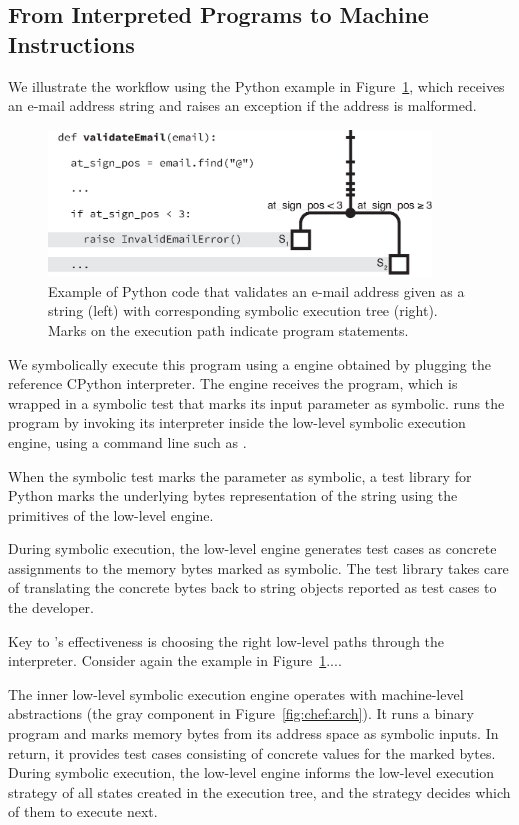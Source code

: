 \subsection{From Interpreted Programs to Machine Instructions}

We illustrate the \chef workflow using the Python example in Figure~\ref{fig:chef:running-example}, which receives an e-mail address string and raises an exception if the address is malformed.

\begin{figure}
  \centering
  \includegraphics[width=4in]{figures/chef/running-example}
  \caption{Example of Python code that validates an e-mail address given as a string (left) with corresponding symbolic execution tree (right).  Marks on the execution path indicate program statements.}
  \label{fig:chef:running-example}
\end{figure}

We symbolically execute this program using a \chef engine obtained by plugging the reference CPython interpreter.
%
The \chef engine receives the program, which is wrapped in a symbolic test that marks its input parameter  as symbolic.
%
\chef runs the program by invoking its interpreter inside the low-level symbolic execution engine, using a command line such as .

When the symbolic test marks the  parameter as symbolic, a \chef test library for Python marks the underlying bytes representation of the string using the primitives of the low-level engine.

During symbolic execution, the low-level engine generates test cases as concrete assignments to the memory bytes marked as symbolic.
%
The \chef test library takes care of translating the concrete bytes back to string objects reported as test cases to the developer.

Key to \chef's effectiveness is choosing the right low-level paths through the interpreter.
%
Consider again the example in Figure~\ref{fig:chef:running-example}....


The inner low-level symbolic execution engine operates with machine-level abstractions (the gray component in Figure~\ref{fig:chef:arch}).
%
It runs a binary program and marks memory bytes from its address space as symbolic inputs.  In return, it provides test cases consisting of concrete values for the marked bytes.
%
During symbolic execution, the low-level engine informs the low-level execution strategy of all states created in the execution tree, and the strategy decides which of them to execute next.


